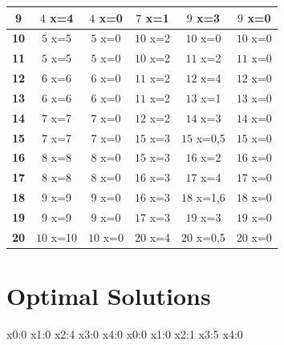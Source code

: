 \documentclass{article}
\begin{document}
\begin{center}
\begin{tabular}{|c||c|c|c|c|c|}
        \hline
        \textbf{9}& \cellcolor[HTML]{3FFC45}$4$ x={4} & \cellcolor[HTML]{FC3F3F}$4$ x={0}& \cellcolor[HTML]{3FFC45}$7$ x={1} & \cellcolor[HTML]{3FFC45}$9$ x={3} & \cellcolor[HTML]{FC3F3F}$9$ x={0}\\
        \hline
        \textbf{10}& \cellcolor[HTML]{3FFC45}$5$ x={5} & \cellcolor[HTML]{FC3F3F}$5$ x={0}& \cellcolor[HTML]{3FFC45}$10$ x={2} & \cellcolor[HTML]{FC3F3F}$10$ x={0}& \cellcolor[HTML]{FC3F3F}$10$ x={0}\\
        \hline
        \textbf{11}& \cellcolor[HTML]{3FFC45}$5$ x={5} & \cellcolor[HTML]{FC3F3F}$5$ x={0}& \cellcolor[HTML]{3FFC45}$10$ x={2} & \cellcolor[HTML]{3FFC45}$11$ x={2} & \cellcolor[HTML]{FC3F3F}$11$ x={0}\\
        \hline
        \textbf{12}& \cellcolor[HTML]{3FFC45}$6$ x={6} & \cellcolor[HTML]{FC3F3F}$6$ x={0}& \cellcolor[HTML]{3FFC45}$11$ x={2} & \cellcolor[HTML]{3FFC45}$12$ x={4} & \cellcolor[HTML]{FC3F3F}$12$ x={0}\\
        \hline
        \textbf{13}& \cellcolor[HTML]{3FFC45}$6$ x={6} & \cellcolor[HTML]{FC3F3F}$6$ x={0}& \cellcolor[HTML]{3FFC45}$11$ x={2} & \cellcolor[HTML]{3FFC45}$13$ x={1} & \cellcolor[HTML]{FC3F3F}$13$ x={0}\\
        \hline
        \textbf{14}& \cellcolor[HTML]{3FFC45}$7$ x={7} & \cellcolor[HTML]{FC3F3F}$7$ x={0}& \cellcolor[HTML]{3FFC45}$12$ x={2} & \cellcolor[HTML]{3FFC45}$14$ x={3} & \cellcolor[HTML]{FC3F3F}$14$ x={0}\\
        \hline
        \textbf{15}& \cellcolor[HTML]{3FFC45}$7$ x={7} & \cellcolor[HTML]{FC3F3F}$7$ x={0}& \cellcolor[HTML]{3FFC45}$15$ x={3} & \cellcolor[HTML]{3F62FC}$15$ x={0,5}& \cellcolor[HTML]{FC3F3F}$15$ x={0}\\
        \hline
        \textbf{16}& \cellcolor[HTML]{3FFC45}$8$ x={8} & \cellcolor[HTML]{FC3F3F}$8$ x={0}& \cellcolor[HTML]{3FFC45}$15$ x={3} & \cellcolor[HTML]{3FFC45}$16$ x={2} & \cellcolor[HTML]{FC3F3F}$16$ x={0}\\
        \hline
        \textbf{17}& \cellcolor[HTML]{3FFC45}$8$ x={8} & \cellcolor[HTML]{FC3F3F}$8$ x={0}& \cellcolor[HTML]{3FFC45}$16$ x={3} & \cellcolor[HTML]{3FFC45}$17$ x={4} & \cellcolor[HTML]{FC3F3F}$17$ x={0}\\
        \hline
        \textbf{18}& \cellcolor[HTML]{3FFC45}$9$ x={9} & \cellcolor[HTML]{FC3F3F}$9$ x={0}& \cellcolor[HTML]{3FFC45}$16$ x={3} & \cellcolor[HTML]{3F62FC}$18$ x={1,6}& \cellcolor[HTML]{FC3F3F}$18$ x={0}\\
        \hline
        \textbf{19}& \cellcolor[HTML]{3FFC45}$9$ x={9} & \cellcolor[HTML]{FC3F3F}$9$ x={0}& \cellcolor[HTML]{3FFC45}$17$ x={3} & \cellcolor[HTML]{3FFC45}$19$ x={3} & \cellcolor[HTML]{FC3F3F}$19$ x={0}\\
        \hline
        \textbf{20}& \cellcolor[HTML]{3FFC45}$10$ x={10} & \cellcolor[HTML]{FC3F3F}$10$ x={0}& \cellcolor[HTML]{3FFC45}$20$ x={4} & \cellcolor[HTML]{3F62FC}$20$ x={0,5}& \cellcolor[HTML]{FC3F3F}$20$ x={0}\\
        \hline
    \end{tabular}
\end{center}


\section{Optimal Solutions}
x0:0 x1:0 x2:4 x3:0 x4:0 x0:0 x1:0 x2:1 x3:5 x4:0 
\end{document}
